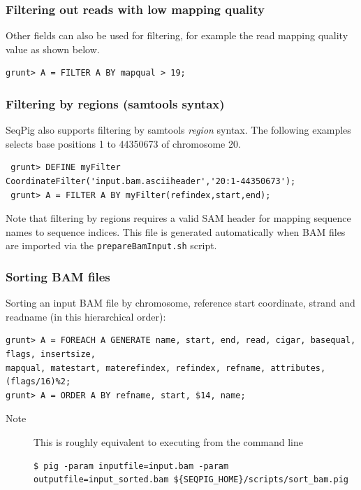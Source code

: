 \subsubsection{Filtering out reads with low mapping quality}

Other fields can also be used for filtering, for example the read
mapping quality value as shown below.
\begin{lstlisting}
grunt> A = FILTER A BY mapqual > 19;
\end{lstlisting}

\subsubsection{Filtering by regions (samtools syntax)}

SeqPig also supports filtering by samtools \emph{region} syntax.
The following examples selects base positions 1 to 44350673
of chromosome 20.
\begin{lstlisting}
 grunt> DEFINE myFilter CoordinateFilter('input.bam.asciiheader','20:1-44350673');
 grunt> A = FILTER A BY myFilter(refindex,start,end);
\end{lstlisting}
Note that filtering by regions requires a valid SAM header for mapping
sequence names to sequence indices. This file is generated automatically
when BAM files are imported via the {\tt prepareBamInput.sh} script.

\subsubsection{Sorting BAM files}
Sorting an input BAM file by chromosome, reference start coordinate, strand
and readname (in this hierarchical order):
\begin{lstlisting}
grunt> A = FOREACH A GENERATE name, start, end, read, cigar, basequal, flags, insertsize,
mapqual, matestart, materefindex, refindex, refname, attributes, (flags/16)%2;
grunt> A = ORDER A BY refname, start, $14, name;
\end{lstlisting}
\begin{description}
	\item[Note] This is roughly equivalent to executing from the command line
\begin{lstlisting}
$ pig -param inputfile=input.bam -param outputfile=input_sorted.bam ${SEQPIG_HOME}/scripts/sort_bam.pig
\end{lstlisting}
\end{description}

